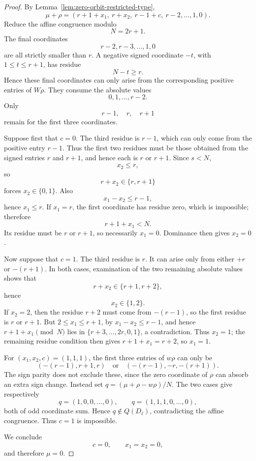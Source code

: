 \documentclass[11pt]{amsart}
\theoremstyle{remark}
\numberwithin{equation}{section}
\begin{document}
\begin{proof}
By Lemma~\ref{lem:zero-orbit-restricted-type},
\[
   \mu+\rho
   =
   (r+1+x_1,\ r+x_2,\ r-1+c,\ r-2,\ldots,1,0).
\]
Reduce the affine congruence modulo
\[
   N=2r+1.
\]
The final coordinates
\[
   r-2,r-3,\ldots,1,0
\]
are all strictly smaller than \(r\).  A negative signed coordinate
\(-t\), with \(1\le t\le r+1\), has residue
\[
   N-t\ge r.
\]
Hence these final coordinates can only arise from the corresponding
positive entries of \(W\rho\).  They consume the absolute values
\[
   0,1,\ldots,r-2.
\]
Only
\[
   r-1,\quad r,\quad r+1
\]
remain for the first three coordinates.

Suppose first that \(c=0\).  The third residue is \(r-1\), which can only
come from the positive entry \(r-1\).  Thus the first two residues must be
those obtained from the signed entries \(r\) and \(r+1\), and hence each is
\(r\) or \(r+1\).  Since \(s<N\),
\[
   x_2\le r,
\]
so
\[
   r+x_2\in\{r,r+1\}
\]
forces \(x_2\in\{0,1\}\).  Also
\[
   x_1-x_2\le r-1,
\]
hence \(x_1\le r\).  If \(x_1=r\), the first coordinate has residue zero,
which is impossible; therefore
\[
   r+1+x_1<N.
\]
Its residue must be \(r\) or \(r+1\), so necessarily \(x_1=0\).  Dominance
then gives \(x_2=0\).

Now suppose that \(c=1\).  The third residue is \(r\).  It can arise only
from either \(+r\) or \(-(r+1)\).  In both cases, examination of the two
remaining absolute values shows that
\[
   r+x_2\in\{r+1,r+2\},
\]
hence
\[
   x_2\in\{1,2\}.
\]
If \(x_2=2\), then the residue \(r+2\) must come from \(-(r-1)\),
so the first residue is \(r\) or \(r+1\).  But
\(2\le x_1\le r+1\), by \(x_1-x_2\le r-1\), and hence
\(r+1+x_1\pmod N\) lies in
\(\{r+3,\ldots,2r,0,1\}\), a contradiction.  Thus \(x_2=1\); the
remaining residue condition then gives \(r+1+x_1=r+2\), so \(x_1=1\).

For \((x_1,x_2,c)=(1,1,1)\), the first three entries of \(w\rho\)
can only be
\[
   (-(r-1),r+1,r)\quad\text{or}\quad (-(r-1),-r,-(r+1)).
\]
The sign parity does not exclude these, since the zero coordinate of
\(\rho\) can absorb an extra sign change.  Instead set
\(q=(\mu+\rho-w\rho)/N\).  The two cases give respectively
\[
   q=(1,0,0,\ldots,0),\qquad q=(1,1,1,0,\ldots,0),
\]
both of odd coordinate sum.  Hence \(q\notin Q(D_\ell)\), contradicting
the affine congruence.  Thus \(c=1\) is impossible.

We conclude
\[
   c=0,\qquad x_1=x_2=0,
\]
and therefore \(\mu=0\).
\end{proof}
\end{document}

